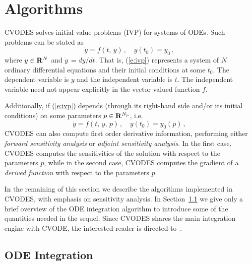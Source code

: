 \section{Algorithms}\label{s:algorithms}

CVODES solves initial value problems (IVP) for systems of ODEs. 
Such problems can be stated as
\begin{equation}\label{e:ivp}
\dot{y} = f(t,\,y) \, , \quad y(t_0) = y_0 \, ,
\end{equation}
where $y \in {\bf R}^N$ and $\dot{y}\,=dy/dt$.
That is, (\ref{e:ivp}) represents a system of $N$ ordinary
differential equations and their initial conditions at some $t_0$. The
dependent variable is $y$ and the independent variable is $t$. The
independent variable need not appear explicitly in the vector valued
function $f$.

Additionally, if (\ref{e:ivp}) depends (through its right-hand side and/or its initial
conditions) on some parameters $p \in {\bf R}^{N_p}$, i.e.
\begin{equation}\label{e:ivp_p}
\dot{y}  = f(t,\,y,\,p) \, , \quad y(t_0)  = y_0(p) \, ,
\end{equation}
CVODES can also compute first order derivative information, performing either
{\em forward sensitivity analysis} or {\em adjoint sensitivity analysis}.
In the first case, CVODES computes the sensitivities of the solution with respect to the 
parameters $p$, while in the second case, CVODES computes the gradient of a 
{\em derived function} with respect to the parameters $p$.

In the remaining of this section we describe the algorithms implemented in CVODES,
with emphasis on sensitivity analysis. In Section~\ref{ss:integration} we give only a 
brief overview of the ODE integration algorithm to introduce some of the
quantities needed in the sequel. 
Since CVODES shares the main integration engine with CVODE, the interested reader is
directed to~\cite{HBGLSSW:03}.


\subsection{ODE Integration}\label{ss:integration}

